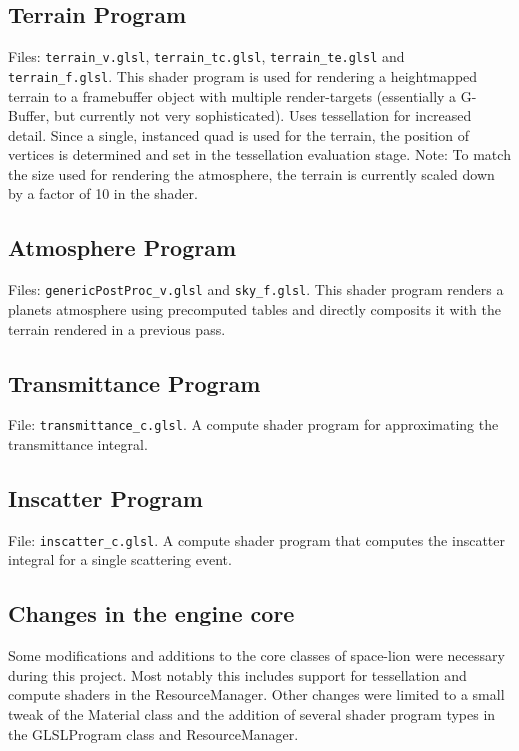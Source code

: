 \documentclass[12pt]{article}
\begin{document}
\subsection*{Terrain Program}
Files: \texttt{terrain\_v.glsl}, \texttt{terrain\_tc.glsl}, \texttt{terrain\_te.glsl} and \texttt{terrain\_f.glsl}.\newline
This shader program is used for rendering a heightmapped terrain to a framebuffer object with multiple render-targets (essentially a G-Buffer, but currently not very sophisticated). Uses tessellation for increased detail. Since a single, instanced quad is used for the terrain, the position of vertices is determined and set in the tessellation evaluation stage.\newline
Note: To match the size used for rendering the atmosphere, the terrain is currently scaled down by a factor of 10 in the shader.
\subsection*{Atmosphere Program}
Files: \texttt{genericPostProc\_v.glsl} and \texttt{sky\_f.glsl}.\newline
This shader program renders a planets atmosphere using precomputed tables and directly composits it with the terrain rendered in a previous pass.
\subsection*{Transmittance Program}
File: \texttt{transmittance\_c.glsl}.\newline
A compute shader program for approximating the transmittance integral.
\subsection*{Inscatter Program}
File: \texttt{inscatter\_c.glsl}.\newline
A compute shader program that computes the inscatter integral for a single scattering event.
\subsection*{Changes in the engine core}
Some modifications and additions to the core classes of space-lion were necessary during this project. Most notably this includes support for tessellation and compute shaders in the ResourceManager. Other changes were limited to a small tweak of the Material class and the addition of several shader program types in the GLSLProgram class and ResourceManager. 
\end{document}
